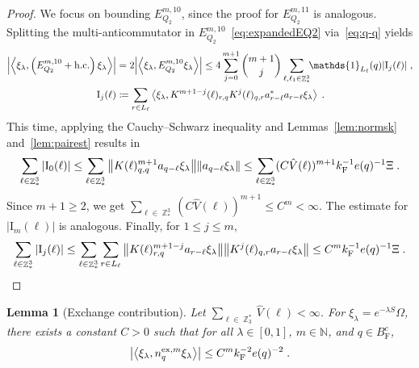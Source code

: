 \documentclass[12pt,a4paper]{article}
\numberwithin{equation}{section}
\newcommand{\NNN}{\mathbb{N}}
\newcommand{\1}{\mathbb{I}}
\newcommand{\ex}{\mathrm{ex}}
\newcommand{\F}{\mathrm{F}}
\newcommand{\I}{\mathrm{I}}
\DeclareMathOperator{\Z}{\mathbb{Z}}
\newcommand{\eva}[1]{\left\langle #1 \right\rangle}
\theoremstyle{plain}
\newtheorem{lemma}[theorem]{Lemma}
\theoremstyle{definition}
\theoremstyle{remark}
\theoremstyle{plain}
\theoremstyle{definition}
\theoremstyle{remark}
\begin{document}
\begin{proof}
We focus on bounding $ E^{m,10}_{Q_2} $, since the proof for $ E^{m,11}_{Q_2} $ is analogous.
Splitting the multi-anticommutator in $ E^{m,10}_{Q_2} $~\eqref{eq:expandedEQ2} via~\eqref{eq:q-q} yields
\begin{equation} \label{eq:EQ2121}
\begin{aligned}
	\abs{\eva{\xi_\lambda,\left(E^{m,10}_{Q_2}+\mathrm{h.c.}\right) \xi_\lambda }} 
	&= 2\abs{\eva{\xi_\lambda, E^{m,10}_{Q_2} \xi_\lambda }}
	\le 4 \sum_{j=0}^{m+1} {{m+1}\choose j} \sum\limits_{\ell,\ell_1  \in \Z^3_*}\!\! \mathds{1}_{L_\ell}(q) |\I_j(\ell)| \;,\\
	\I_j(\ell)
	&\coloneq \sum\limits_{r\in L_{\ell}}
		\eva{\xi_\lambda, K^{m+1-j}(\ell)_{r,q} K^{j}(\ell)_{q,r} a^*_{r-\ell} a_{r-\ell} \xi_\lambda} \;. \\
\end{aligned}
\end{equation}
This time, applying the Cauchy--Schwarz inequality and Lemmas~\ref{lem:normsk} and~\ref{lem:pairest} results in
\textcolor{green!30!black}{
\begin{equation}
	\sum_{\ell \in \Z^3_*} |\I_0(\ell)|
	\leq \sum_{\ell \in \Z^3_*} \norm{ K(\ell)^{m+1}_{q,q} a_{q-\ell} \xi_\lambda}\norm{ a_{q-\ell} \xi_\lambda }
	\leq \sum_{\ell \in \Z^3_*} (C \hat{V}(\ell))^{m+1}
		k_{\F}^{-1} e(q)^{-1} \Xi \;.\label{eq:estEQ2121}
\end{equation}
Since $ m+1 \ge 2 $, we get $ \sum_{\ell \in \Z^3_*} (C \hat{V}(\ell))^{m+1} \le C^m < \infty $. The estimate for $ |\I_m(\ell)| $ is analogous. Finally, for $ 1 \le j \le m $,
\begin{equation}
	\sum_{\ell \in \Z^3_*} |\I_j(\ell)|
	\leq \sum_{\ell \in \Z^3_*} \sum\limits_{r \in L_{\ell}} \norm{ K(\ell)^{m+1-j}_{r,q} a_{r-\ell}\xi_\lambda}\norm{ K^j(\ell)_{q,r} a_{r-\ell} \xi_\lambda }
	\leq C^m k_{\F}^{-1} e(q)^{-1} \Xi \;. \label{eq:estEQ2122}
\end{equation}
}
\end{proof}

\begin{lemma}[Exchange contribution] \label{lem:estnqex}
Let $ \sum_{\ell \in \Z_3^*} \hat{V}(\ell) < \infty $. For $\xi_\lambda = e^{-\lambda S} \Omega$, there exists a constant $ C > 0 $ such that for all $ \lambda \in [0,1] $, $ m \in \NNN $, and $ q \in B_{\F}^c $,
\begin{equation}
	\abs{\eva{\xi_\lambda, n_q^{\ex,m} \xi_\lambda }}
	\leq C^m k_{\F}^{-2} e(q)^{-2} \;. \label{eq:estnqex}
\end{equation}
\end{lemma}
\end{document}
